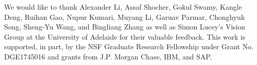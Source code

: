 \documentclass[main.tex]{subfiles}
\begin{document}
We would like to thank Alexander Li, Assaf Shocher,  Gokul Swamy, Kangle Deng, Ruihan Gao, Nupur Kumari, Muyang Li, Garuav Parmar, Chonghyuk Song, Sheng-Yu Wang, and Bingliang Zhang as well as Simon Lucey's Vision Group at the University of Adelaide for their valuable feedback.
This work is supported, in part, by the NSF Graduate Research Fellowship under Grant No. DGE1745016 and grants from J.P. Morgan Chase, IBM, and SAP. 
\end{document}
